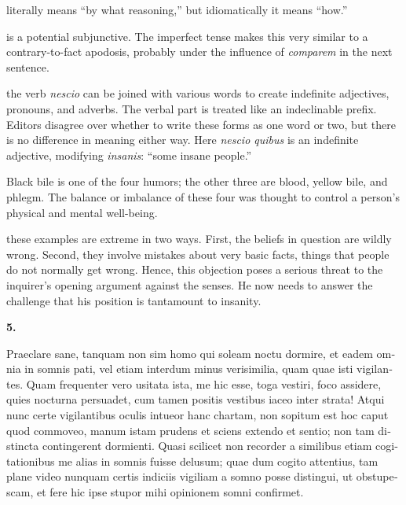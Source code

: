  literally means ``by what reasoning,'' but idiomatically it means ``how.''

 is a potential subjunctive. The imperfect tense makes this very similar to a contrary-to-fact apodosis, probably under the influence of \textit{comparem} in the next sentence.

 the verb \textit{nescio} can be joined with various words to create indefinite adjectives, pronouns, and adverbs. The verbal part is treated like an indeclinable prefix. Editors disagree over whether to write these forms as one word or two, but there is no difference in meaning either way. Here \textit{nescio quibus} is an indefinite adjective, modifying \textit{insanis}: ``some insane people.''

 Black bile is one of the four humors; the other three are blood, yellow bile, and phlegm. The balance or imbalance of these four was thought to control a person's physical and mental well-being.

 these examples are extreme in two ways. First, the beliefs in question are wildly wrong. Second, they involve mistakes about very basic facts, things that people do not normally get wrong. Hence, this objection poses a serious threat to the inquirer's opening argument against the senses. He now needs to answer the challenge that his position is tantamount to insanity.

\clearpage

\beginnumbering
\pstart
\textbf{5.} \begin{latin}Praeclare sane, tanquam non sim homo qui soleam noctu dormire, et eadem omnia in somnis pati, vel etiam interdum minus verisimilia, quam quae isti vigilantes. Quam frequenter vero usitata ista, me hic esse, toga vestiri, foco assidere, quies nocturna persuadet, cum tamen positis vestibus iaceo inter strata! Atqui nunc certe vigilantibus oculis intueor hanc chartam, non sopitum est hoc caput quod commoveo, manum istam prudens et sciens extendo et sentio; non tam distincta contingerent dormienti. Quasi scilicet non recorder a similibus etiam cogitationibus me alias in somnis fuisse delusum; quae dum cogito attentius, tam plane video nunquam certis indiciis vigiliam a somno posse distingui, ut obstupescam, et fere hic ipse stupor mihi opinionem somni confirmet.\end{latin}
\pend
\endnumbering

